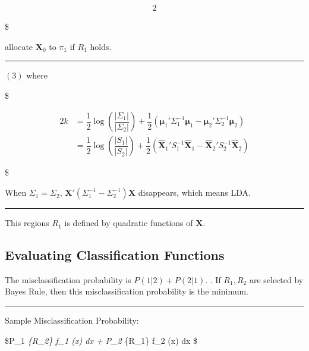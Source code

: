 \documentclass[
]{book}
\begin{document}
{{{\begin{alignat*}{2}
\end{alignat*}

\$

allocate \(\pmb X_0\) to \(\pi_1\) if \(R_1\) holds.

\begin{center}\rule{0.5\linewidth}{0.5pt}\end{center}

\((3)\) where

\$

\begin{alignat*}{2} 

k &= \dfrac {1} {2} \log \left( \dfrac {\vert \Sigma_1 \vert}{\vert \Sigma_2 \vert}\right) + \dfrac {1}{2} (\pmb \mu_1 ' \Sigma_1^{-1} \pmb \mu_1 - \pmb \mu_2 ' \Sigma_2^{-1} \pmb \mu_2) \\ 

&= \dfrac {1} {2} \log \left( \dfrac {\vert S_1 \vert}{\vert S_2 \vert}\right) + \dfrac {1}{2} (\hat {\pmb X}_1 ' S_1^{-1} \hat {\pmb X}_1 - \hat {\pmb X}_2 ' S_2^{-1} \hat {\pmb X}_2) 

\end{alignat*}

\$

When \(\Sigma_1 = \Sigma_2\), \(\pmb X ' (\Sigma_1^{-1} - \Sigma_2^{-1} ) \pmb X\) disappears, which means LDA.

\begin{center}\rule{0.5\linewidth}{0.5pt}\end{center}

This regions \(R_1\) is defined by quadratic functions of \(\pmb X\).

\hypertarget{evaluating-classification-functions}{%
\subsection{Evaluating Classification Functions}\label{evaluating-classification-functions}}

The misclassification probability is \(P(1 \vert 2) + P(2 \vert 1)\). . If \(R_1, R_2\) are selected by Bayes Rule, then this misclassification probability is the minimum.

\begin{center}\rule{0.5\linewidth}{0.5pt}\end{center}

Sample Misclassification Probability:

\$P\_1 \int\emph{\{\hat R\_2\} \hat f\_1 (\pmb x) d\pmb x + P\_2 \int}\{\hat R\_1\} \hat f\_2 (\pmb x) d\pmb x \$

}}}
\end{document}
